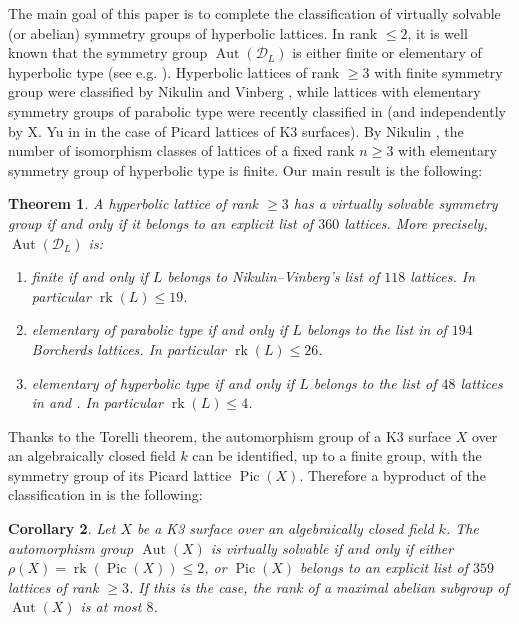 \documentclass[11pt,letterpaper]{amsart}
\DeclareMathOperator{\rk}{rk}
\DeclareMathOperator{\Aut}{Aut}
\DeclareMathOperator{\Pic}{Pic}
\newtheorem{theorem}{Theorem}[section]
\newtheorem{corollary}[theorem]{Corollary}
\theoremstyle{definition}
\theoremstyle{remark}
\begin{document}
The main goal of this paper is to complete the classification of virtually solvable (or abelian) symmetry groups of hyperbolic lattices. In rank $\le 2$, it is well known that the symmetry group $\Aut(\mathcal{D}_L)$ is either finite or elementary of hyperbolic type (see e.g. \cite{galluzzi.lombardo.peters}). 
Hyperbolic lattices of rank $\ge 3$ with finite symmetry group were classified by Nikulin \cite{nikulin.finite.aut.greater.5, nikulin.finite.aut.3} and Vinberg \cite{vinberg.finite.aut.4}, while lattices with elementary symmetry groups of parabolic type were recently classified in \cite{brandhorst.mezzedimi} (and independently by X. Yu in \cite{yu.entropy} in the case of Picard lattices of K3 surfaces).
By Nikulin \cite[Theorem 1]{nikulin.interesting}, the number of isomorphism classes of lattices of a fixed rank $n\geq 3$ with elementary symmetry group of hyperbolic type is finite. 
Our main result is the following:

\begin{theorem} \label{thm:main}
A hyperbolic lattice of rank $\ge 3$ has a virtually solvable symmetry group if and only if it belongs to an explicit list of $360$ lattices. More precisely, $\Aut(\mathcal{D}_L)$ is:
\begin{enumerate}
    \item finite if and only if $L$ belongs to Nikulin--Vinberg's list of $118$ lattices. In particular $\rk(L)\le 19$.
    \item elementary of parabolic type if and only if $L$ belongs to the list in \cite{brandhorst.mezzedimi} of $194$ Borcherds lattices. In particular $\rk(L)\le 26$.
    \item elementary of hyperbolic type if and only if $L$ belongs to the list of $48$ lattices in  and . In particular $\rk(L)\le 4$.
\end{enumerate}
\end{theorem}

Thanks to the Torelli theorem, the automorphism group of a K3 surface $X$ over an algebraically closed field $k$ can be identified, up to a finite group, with the symmetry group of its Picard lattice $\Pic(X)$. Therefore a byproduct of the classification in  is the following:

\begin{corollary}
Let $X$ be a K3 surface over an algebraically closed field $k$. The automorphism group $\Aut(X)$ is virtually solvable if and only if either $\rho(X)=\rk(\Pic(X))\le 2$, or $\Pic(X)$ belongs to an explicit list of $359$ lattices of rank $\ge 3$. If this is the case, the rank of a maximal abelian subgroup of $\Aut(X)$ is at most $8$.
\end{corollary}
\end{document}
